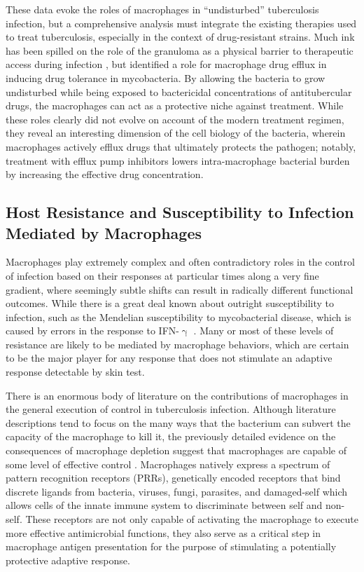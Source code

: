 These data evoke the roles of macrophages in ``undisturbed'' tuberculosis infection, but a comprehensive analysis must integrate the existing therapies used to treat tuberculosis, especially in the context of drug\hyp{}resistant strains. Much ink has been spilled on the role of the granuloma as a physical barrier to therapeutic access during infection \citep{Ekins2014, Cronan2022, Driver2012, Cicchese2020}, but \citet{Adams2011} identified a role for macrophage drug efflux in inducing drug tolerance in mycobacteria. By allowing the bacteria to grow undisturbed while being exposed to bactericidal concentrations of antitubercular drugs, the macrophages can act as a protective niche against treatment. While these roles clearly did not evolve on account of the modern treatment regimen, they reveal an interesting dimension of the cell biology of the bacteria, wherein macrophages actively efflux drugs that ultimately protects the pathogen; notably, treatment with efflux pump inhibitors lowers intra\hyp{}macrophage bacterial burden by increasing the effective drug concentration.

\subsection{Host Resistance and Susceptibility to Infection Mediated by Macrophages}\label{macsig}

Macrophages play extremely complex and often contradictory roles in the control of infection based on their responses at particular times along a very fine gradient, where seemingly subtle shifts can result in radically different functional outcomes. While there is a great deal known about outright susceptibility to infection, such as the Mendelian susceptibility to mycobacterial disease, which is caused by errors in the response to IFN\hyp{}$\upgamma$ \citep{Bustamante2014}. Many or most of these levels of resistance are likely to be mediated by macrophage behaviors, which are certain to be the major player for any response that does not stimulate an adaptive response detectable by skin test.

There is an enormous body of literature on the contributions of macrophages in the general execution of control in tuberculosis infection. Although literature descriptions tend to focus on the many ways that the bacterium can subvert the capacity of the macrophage to kill it, the previously detailed evidence on the consequences of macrophage depletion suggest that macrophages are capable of some level of effective control \citep{Pagan2015}. Macrophages natively express a spectrum of pattern recognition receptors (PRRs), genetically encoded receptors that bind discrete ligands from bacteria, viruses, fungi, parasites, and damaged\hyp{}self which allows cells of the innate immune system to discriminate between self and non\hyp{}self. These receptors are not only capable of activating the macrophage to execute more effective antimicrobial functions, they also serve as a critical step in macrophage antigen presentation for the purpose of stimulating a potentially protective adaptive response. 

